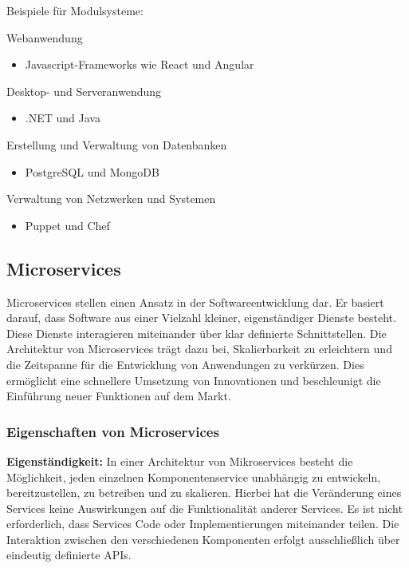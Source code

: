 Beispiele für Modulsysteme:

Webanwendung
\begin{itemize}
    \item Javascript-Frameworks wie React und Angular
\end{itemize}

Desktop- und Serveranwendung
\begin{itemize}
    \item .NET und Java
\end{itemize}

Erstellung und Verwaltung von Datenbanken
\begin{itemize}
    \item PostgreSQL und MongoDB
\end{itemize}

Verwaltung von Netzwerken und Systemen
\begin{itemize}
    \item Puppet und Chef
\end{itemize}
\cite{modulsystem}

\newpage
\subsection*{Microservices}

Microservices stellen einen Ansatz in der Softwareentwicklung dar. Er basiert darauf, 
dass Software aus einer Vielzahl kleiner, eigenständiger Dienste besteht. 
Diese Dienste interagieren miteinander über klar definierte Schnittstellen.
Die Architektur von Microservices trägt dazu bei, Skalierbarkeit zu erleichtern und die 
Zeitspanne für die Entwicklung von Anwendungen zu verkürzen. 
Dies ermöglicht eine schnellere Umsetzung von Innovationen und beschleunigt die Einführung 
neuer Funktionen auf dem Markt. \cite{microservices}

\subsubsection*{Eigenschaften von Microservices}

\textbf{Eigenständigkeit:}
In einer Architektur von Mikroservices besteht die Möglichkeit, jeden einzelnen Komponentenservice 
unabhängig zu entwickeln, bereitzustellen, zu betreiben und zu skalieren. 
Hierbei hat die Veränderung eines Services keine Auswirkungen auf die Funktionalität anderer Services. 
Es ist nicht erforderlich, dass Services Code oder Implementierungen miteinander teilen. 
Die Interaktion zwischen den verschiedenen Komponenten erfolgt ausschließlich 
über eindeutig definierte APIs.
\cite{microservices}

